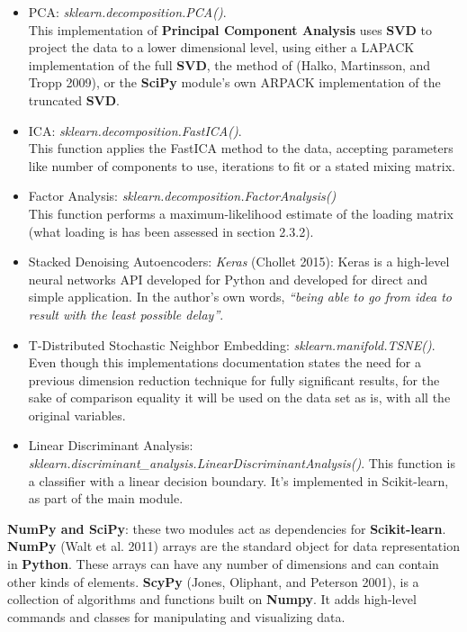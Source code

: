\documentclass[]{article}
\begin{document}
\begin{itemize}
\item
  PCA: \emph{sklearn.decomposition.PCA()}.\\This implementation of
  \textbf{Principal Component Analysis} uses \textbf{SVD} to project the
  data to a lower dimensional level, using either a LAPACK
  implementation of the full \textbf{SVD}, the method of (Halko,
  Martinsson, and Tropp 2009), or the \textbf{SciPy} module's own ARPACK
  implementation of the truncated \textbf{SVD}.
\item
  ICA: \emph{sklearn.decomposition.FastICA()}.\\This function applies
  the FastICA method to the data, accepting parameters like number of
  components to use, iterations to fit or a stated mixing matrix.
\item
  Factor Analysis: \emph{sklearn.decomposition.FactorAnalysis()}\\This
  function performs a maximum-likelihood estimate of the loading matrix
  (what loading is has been assessed in section 2.3.2).
\item
  Stacked Denoising Autoencoders: \emph{Keras} (Chollet 2015): Keras is
  a high-level neural networks API developed for Python and developed
  for direct and simple application. In the author's own words,
  \emph{``being able to go from idea to result with the least possible
  delay''}.
\item
  T-Distributed Stochastic Neighbor Embedding:
  \emph{sklearn.manifold.TSNE()}. Even though this implementations
  documentation states the need for a previous dimension reduction
  technique for fully significant results, for the sake of comparison
  equality it will be used on the data set as is, with all the original
  variables.
\item
  Linear Discriminant Analysis:
  \emph{sklearn.discriminant\_analysis.LinearDiscriminantAnalysis()}.
  This function is a classifier with a linear decision boundary. It's
  implemented in Scikit-learn, as part of the main module.
\end{itemize}

\textbf{NumPy and SciPy}: these two modules act as dependencies for
\textbf{Scikit-learn}. \textbf{NumPy} (Walt et al. 2011) arrays are the
standard object for data representation in \textbf{Python}. These arrays
can have any number of dimensions and can contain other kinds of
elements. \textbf{ScyPy} (Jones, Oliphant, and Peterson 2001), is a
collection of algorithms and functions built on \textbf{Numpy}. It adds
high-level commands and classes for manipulating and visualizing data.
\end{document}
